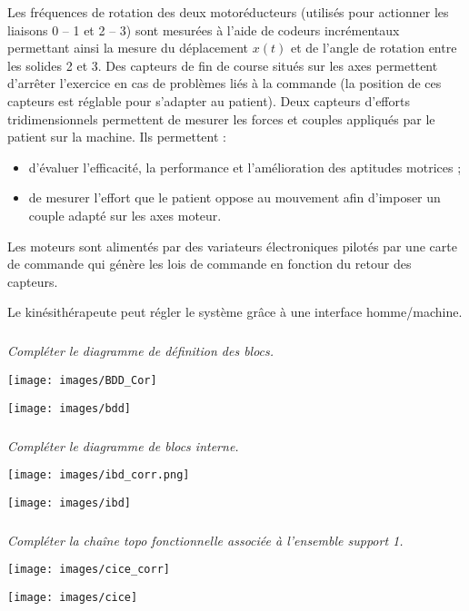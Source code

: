 \documentclass[10pt]{article}
\begin{document}
Les fréquences de rotation des deux motoréducteurs (utilisés pour actionner les liaisons 0 – 1 et 2 – 3) sont mesurées à l'aide de codeurs incrémentaux permettant ainsi la mesure du déplacement $x(t)$ et de l’angle de rotation entre les solides 2 et 3. Des capteurs de fin de course situés sur les axes permettent d'arrêter l'exercice en cas de problèmes liés à la commande (la position de ces capteurs est réglable pour s'adapter au patient). Deux capteurs d'efforts tridimensionnels permettent de mesurer les forces et couples appliqués par le patient sur la machine. Ils permettent :
\begin{itemize}
\item d'évaluer l'efficacité, la performance et l'amélioration des aptitudes motrices ;
\item de mesurer l'effort que le patient oppose au mouvement afin d'imposer un couple adapté sur les axes moteur.
\end{itemize}
Les moteurs sont alimentés par des variateurs électroniques pilotés par une carte de commande qui génère les lois de commande en fonction du retour des capteurs.

Le kinésithérapeute peut régler le système grâce à une interface homme/machine.

\fi

\subparagraph{}
\textit{Compléter le diagramme de définition des blocs.}

\ifprof
\begin{corrige}
\begin{center}
\texttt{[image: images/BDD\_Cor]}
\end{center}
\end{corrige}
\else
\begin{center}
\texttt{[image: images/bdd]}
\end{center}
\fi


\subparagraph{}
\textit{Compléter le diagramme de blocs interne.}

\ifprof
\begin{corrige}
\begin{center}
\texttt{[image: images/ibd\_corr.png]}
\end{center}
\end{corrige}
\else
\begin{center}
\texttt{[image: images/ibd]}
\end{center}
\fi



\subparagraph{}
\textit{Compléter la chaîne topo fonctionnelle associée à l’ensemble support 1.}

\ifprof
\begin{corrige}
\begin{center}
\texttt{[image: images/cice\_corr]}
\end{center}
\end{corrige}
\else
\begin{center}
\texttt{[image: images/cice]}
\end{center}
\fi
\end{document}

